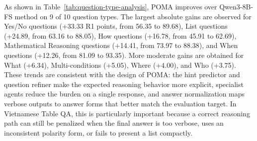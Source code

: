 \documentclass[]{interact}
\begin{document}
\begin{table}[!t]
\centering
\caption{R1 comparison between models by question type on the Open-ViTabQA test set. The best scores are bold.}
\label{tab:question-type-analysis}
\end{table}

As shown in Table~\ref{tab:question-type-analysis}, POMA improves over Qwen3-8B-FS method on 9 of 10 question types. The largest absolute gains are observed for Yes/No questions (+33.33 R1 points, from 56.35 to 89.68), List questions (+24.89, from 63.16 to 88.05), How questions (+16.78, from 45.91 to 62.69), Mathematical Reasoning questions (+14.41, from 73.97 to 88.38), and When questions (+12.26, from 81.09 to 93.35). More moderate gains are obtained for What (+6.34), Multi-conditions (+5.05), Where (+4.00), and Who (+3.75). These trends are consistent with the design of POMA: the hint predictor and question refiner make the expected reasoning behavior more explicit, specialist agents reduce the burden on a single response, and answer normalization maps verbose outputs to answer forms that better match the evaluation target. In Vietnamese Table QA, this is particularly important because a correct reasoning path can still be penalized when the final answer is too verbose, uses an inconsistent polarity form, or fails to present a list compactly.
\end{document}
